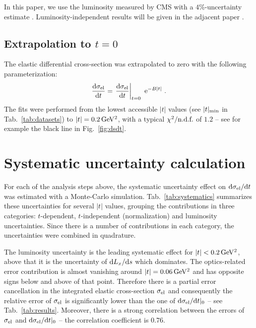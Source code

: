 \documentclass[doublecol]{../macros/epl2}
\def\d{{\rm d}}
\def\un#1{\,{\rm #1}}
\def\e{{\rm e}}
\begin{document}
In this paper, we use the luminosity measured by CMS with a $4\%$-uncertainty estimate%
. Luminosity-independent results will be given in the adjacent paper \cite{P3}.


\subsection{Extrapolation to $t=0$}

The elastic differential cross-section was extrapolated to zero with the following parameterization:
\begin{equation}
\label{eq:extrapolation}
{\d\sigma_{\rm el}\over \d t} = \left. {\d\sigma_{\rm el}\over \d t}\right|_{t=0} \ \e^{-B|t|}\ .
\end{equation}
The fits were performed from the lowest accessible $|t|$ values (see $|t|_{\rm min}$ in Tab.~\ref{tab:datasets}) to $|t| = 0.2\un{GeV^2}$, with a typical $\chi^2/\hbox{n.d.f.}$ of $1.2$ -- see for example the black line in Fig.~\ref{fig:dsdt}.

\section{Systematic uncertainty calculation}


For each of the analysis steps above, the systematic uncertainty effect on $\d\sigma_{\rm el}/\d t$ was estimated with a Monte-Carlo simulation. Tab.~\ref{tab:systematics} summarizes these uncertainties for several $|t|$ values, grouping the contributions in three categories: $t$-dependent, $t$-independent (normalization) and luminosity uncertainties. Since there is a number of contributions in each category, the uncertainties were combined in quadrature.

The luminosity uncertainty is the leading systematic effect for $|t| < 0.2\un{GeV^2}$, above that it is the uncertainty of $\d L_x/\d s$ which dominates. The optics-related error contribution is almost vanishing around $|t| = 0.06\un{GeV^2}$ and has opposite signs below and above of that point. Therefore there is a partial error cancellation in the integrated elastic cross-section $\sigma_{\rm el}$ and consequently the relative error of $\sigma_{\rm el}$ is significantly lower than the one of $\d\sigma_{\rm el}/\d t|_0$ -- see Tab.~\ref{tab:results}. Moreover, there is a strong correlation between the errors of $\sigma_{\rm el}$ and $\d\sigma_{\rm el}/\d t|_0$ -- the correlation coefficient is $0.76$.
\end{document}
